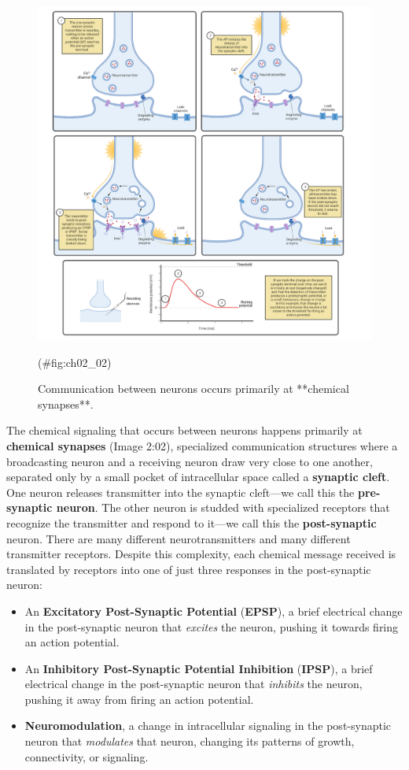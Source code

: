 \documentclass[
]{book}
\begin{document}
\begin{figure}

{\centering \includegraphics[width=0.8\linewidth]{images/ch02/02_02} 

}

\caption{Communication between neurons occurs primarily at **chemical synapses**.}(\#fig:ch02_02)
\end{figure}

The chemical signaling that occurs between neurons happens primarily at \textbf{chemical synapses} (Image 2:02), specialized communication structures where a broadcasting neuron and a receiving neuron draw very close to one another, separated only by a small pocket of intracellular space called a \textbf{synaptic cleft}. One neuron releases transmitter into the synaptic cleft---we call this the \textbf{pre-synaptic neuron}. The other neuron is studded with specialized receptors that recognize the transmitter and respond to it---we call this the \textbf{post-synaptic} neuron. There are many different neurotransmitters and many different transmitter receptors. Despite this complexity, each chemical message received is translated by receptors into one of just three responses in the post-synaptic neuron:

\begin{itemize}
\item
  An \textbf{Excitatory Post-Synaptic Potential} (\textbf{EPSP}), a brief electrical change in the post-synaptic neuron that \emph{excites} the neuron, pushing it towards firing an action potential.
\item
  An \textbf{Inhibitory Post-Synaptic Potential Inhibition} (\textbf{IPSP}), a brief electrical change in the post-synaptic neuron that \emph{inhibits} the neuron, pushing it away from firing an action potential.
\item
  \textbf{Neuromodulation}, a change in intracellular signaling in the post-synaptic neuron that \emph{modulates} that neuron, changing its patterns of growth, connectivity, or signaling.
\end{itemize}
\end{document}

